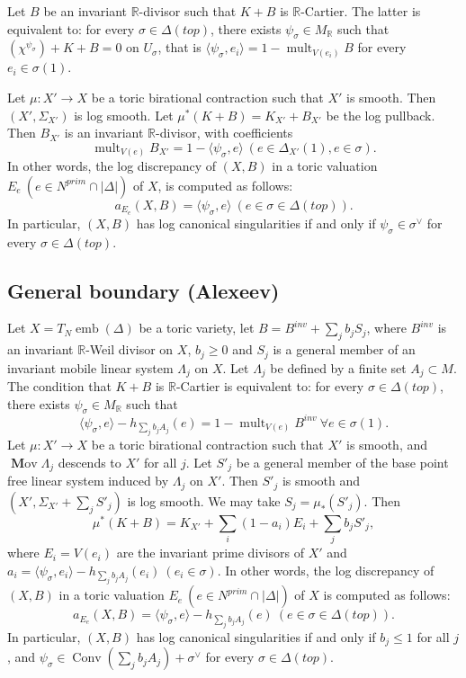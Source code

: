 \documentclass[12pt,twoside]{amsart}
\newcommand{\R}{{\mathbb R}}
\newcommand{\Conv}{\operatorname{Conv}}
\newcommand{\emb}{\operatorname{emb}}
\newcommand{\bMov}{\operatorname{{\mathbf Mov}}}
\newcommand{\mult}{\operatorname{mult}}
\theoremstyle{plain}
\theoremstyle{definition}
\theoremstyle{remark}
\begin{document}

Let $B$ be an invariant $\R$-divisor
such that $K+B$ is $\R$-Cartier. The latter is equivalent to: for every 
$\sigma\in \Delta(top)$, there exists $\psi_\sigma\in M_\R$ such that 
$(\chi^{\psi_\sigma})+K+B=0$ on $U_\sigma$, that is 
$\langle \psi_\sigma,e_i\rangle=1-\mult_{V(e_i)}B$ for every $e_i\in \sigma(1)$.

Let $\mu\colon X'\to X$ be a toric birational contraction such that $X'$ is smooth.
Then $(X',\Sigma_{X'})$ is log smooth. Let $\mu^*(K+B)=K_{X'}+B_{X'}$ be the
log pullback. Then $B_{X'}$ is an invariant $\R$-divisor, with coefficients
$$
\mult_{V(e)}B_{X'}=1-\langle \psi_\sigma,e\rangle \ (e\in \Delta_{X'}(1),e\in \sigma).
$$
In other words, the log discrepancy of $(X,B)$ in a toric valuation $E_e\ (e\in N^{prim}\cap |\Delta|)$ 
of $X$, is computed as follows:
$$
a_{E_e}(X,B)=\langle \psi_\sigma,e\rangle\ (e\in \sigma\in \Delta(top)).
$$
In particular, $(X,B)$ has log canonical singularities if and only if $\psi_\sigma\in \sigma^\vee$ for every
$\sigma\in \Delta(top)$.


\subsection{General boundary (Alexeev)}


Let $X=T_N\emb(\Delta)$ be a toric variety, let $B=B^{inv}+\sum_j b_jS_j$,
where $B^{inv}$ is an invariant $\R$-Weil divisor on $X$, $b_j\ge 0$ and 
$S_j$ is a general member of an invariant mobile linear system $\Lambda_j$ on $X$.
Let $\Lambda_j$ be defined by a finite set $A_j\subset M$.
The condition that $K+B$ is $\R$-Cartier is equivalent to:
for every $\sigma\in \Delta(top)$, there exists $\psi_\sigma\in M_\R$ such that 
$$
\langle \psi_\sigma,e\rangle-h_{\sum_j b_jA_j}(e)=1-\mult_{V(e)}B^{inv}\ \forall e\in \sigma(1).
$$
Let $\mu\colon X'\to X$ be a toric birational contraction such that $X'$ is smooth,
and $\bMov \Lambda_j$ descends to $X'$ for all $j$.
Let $S'_j$ be a general member of the base point free linear system induced by $\Lambda_j$
on $X'$. Then $S'_j$ is smooth and $(X',\Sigma_{X'}+\sum_j S'_j)$ is log smooth.
We may take $S_j=\mu_*(S'_j)$. Then 
$$
\mu^*(K+B)=K_{X'}+\sum_i(1-a_i)E_i+\sum_jb_jS'_j,
$$
where $E_i=V(e_i)$ are the invariant prime divisors of $X'$ and 
$
a_i=\langle \psi_\sigma,e_i\rangle-h_{\sum_j b_jA_j}(e_i) \ (e_i\in \sigma).
$
In other words, the log discrepancy of $(X,B)$ in a toric valuation $E_e\ (e\in N^{prim}\cap |\Delta|)$ 
of $X$ is computed as follows:
$$
a_{E_e}(X,B)=\langle \psi_\sigma,e\rangle-h_{\sum_j b_jA_j}(e)   \ (e\in \sigma\in \Delta(top)).
$$
In particular, $(X,B)$ has log canonical singularities if and only if $b_j\le 1$ for all $j$, and 
$\psi_\sigma\in \Conv(\sum_jb_jA_j)+\sigma^\vee$ for every $\sigma\in \Delta(top)$.
\end{document}
